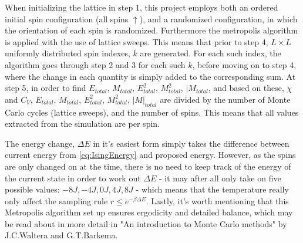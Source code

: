 \documentclass[%
oneside,                 %
final,                   %
10pt]{article}
\begin{document}
\begin{center}\end{center}

When initializing the lattice in step 1, this project employs both an ordered initial spin configuration (all spins $\uparrow$), and a randomized configuration, in which the orientation of each spin is randomized. Furthermore the metropolis algorithm is applied with the use of lattice sweeps. This means that prior to step 4, $L \times L$ uniformly distributed spin indexes, $k$ are generated. For each such index, the algorithm goes through step 2 and 3 for each such $k$, before moving on to step 4, where the change in each quantity is simply added to the corresponding sum. At step 5, in order to find $E_{total}$, $M_{total}$, $E^2_{total}$, $M^2_{total}$, $|M_{total}$, and based on these, $\chi$ and $C_V$, $E_{total}$, $M_{total}$, $E^2_{total}$, $M^2_{total}$, $|M|_{total}$ are divided by the number of Monte Carlo cycles (lattice sweeps), and the number of spins. This means that all values extracted from the simulation are per spin.  \newline


The energy change, $\Delta E$ in it's easiest form simply takes the difference between current energy from \eqref{eq:IsingEnergy} and proposed energy. However, as the spins are only changed on at the time, there is no need to keep track of the energy of the current state in order to work out $\Delta E$ - it may after all only take on five possible values: $-8J, -4J, 0J,4J, 8J$  \cite{HJ-SP} - which means that the temperature really only affect the sampling rule $r\leq e^{-\beta \Delta E}$. Lastly, it's worth mentioning that this Metropolis algorithm set up ensures ergodicity and detailed balance, which may be read about in more detail in 
"An introduction to Monte Carlo methods" by J.C.Waltera and G.T.Barkema\cite{Walter}.
\end{document}
